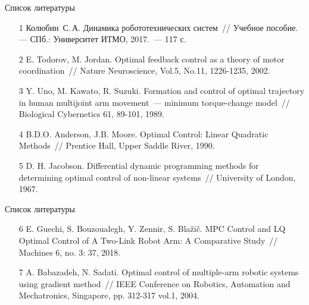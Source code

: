 \documentclass[16pt]{beamer}
\begin{document}
    \begin{frame}{Список литературы}
        \begin{enumerate}
            \item[1] Колюбин~С.\,А. Динамика робототехнических систем~// Учебное пособие. --- СПб.: Университет ИТМО, 2017.~--- 117 с.
            \item[2] E. Todorov, M. Jordan. Optimal feedback control as a theory of motor coordination~// Nature Neuroscience, Vol.5, No.11, 1226-1235, 2002.
            \item[3] Y. Uno, M. Kawato, R. Suzuki. Formation and control of optimal trajectory in human multijoint arm movement~--- minimum torque-change model~// Biological Cybernetics 61, 89-101, 1989.
            \item[4] B.D.O. Anderson, J.B. Moore. Optimal Control: Linear Quadratic Methods~// Prentice Hall, Upper Saddle River, 1990.
            \item[5] D. H. Jacobson. Differential dynamic programming methods for determining optimal control of non-linear systems~// University of London, 1967.
        \end{enumerate}
    \end{frame}

    \begin{frame}{Список литературы}
        \begin{enumerate}
            \item[6] E. Guechi, S. Bouzoualegh, Y. Zennir, S. Blažič. MPC Control and LQ Optimal Control of A Two-Link Robot Arm: A Comparative Study~// Machines 6, no. 3: 37, 2018.
            \item[7] A. Babazadeh, N. Sadati. Optimal control of multiple-arm robotic systems using gradient method~// IEEE Conference on Robotics, Automation and Mechatronics, Singapore, pp. 312-317 vol.1, 2004.
        \end{enumerate}
    \end{frame}
\end{document}
